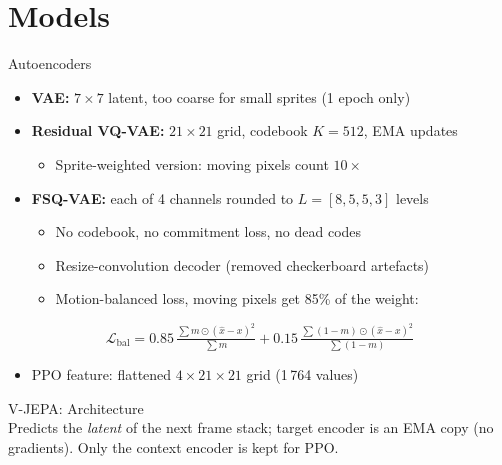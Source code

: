 \documentclass[aspectratio=43,10pt]{beamer}
\begin{document}
\section{Models}

\begin{frame}{Autoencoders}
  \begin{itemize}\setlength\itemsep{0.5em}
    \item \textbf{VAE:} $7\times7$ latent, too coarse for small sprites (1 epoch only)
    \item \textbf{Residual VQ-VAE:} $21\times21$ grid, codebook $K=512$, EMA updates
      \begin{itemize}
        \item Sprite-weighted version: moving pixels count $10\times$
      \end{itemize}
    \item \textbf{FSQ-VAE:} each of 4 channels rounded to $L=[8,5,5,3]$ levels
      \begin{itemize}
        \item No codebook, no commitment loss, no dead codes
        \item Resize-convolution decoder (removed checkerboard artefacts)
        \item Motion-balanced loss, moving pixels get 85\% of the weight:
      \end{itemize}
  \end{itemize}
  \[
    \mathcal{L}_{\text{bal}} = 0.85\,\tfrac{\sum m\odot(\hat x-x)^2}{\sum m}
    +0.15\,\tfrac{\sum (1-m)\odot(\hat x-x)^2}{\sum (1-m)}
  \]
  \begin{itemize}
    \item PPO feature: flattened $4\times21\times21$ grid (1\,764 values)
  \end{itemize}
\end{frame}

\begin{frame}{V-JEPA: Architecture}
  \centering
  \resizebox{\textwidth}{!}{}\\[0.4em]
  {\footnotesize Predicts the \emph{latent} of the next frame stack; target encoder is an
  EMA copy (no gradients). Only the context encoder is kept for PPO.}
\end{frame}
\end{document}
